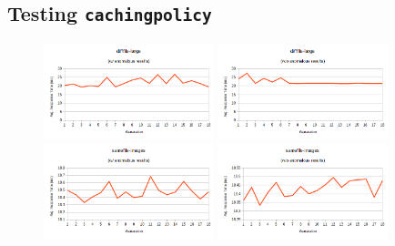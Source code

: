 \documentclass[compsoc,12pt,a4paper]{IEEEtran}
\begin{document}
		\subsection{Testing \lstinline|cachingpolicy|}
		\label{sec:testingcache}
		
			\begin{figure}
				\vspace{-20pt}
			  	\begin{center}
			    	\includegraphics[width=0.44\textwidth]{difffile-large}
					\vspace{-20pt}
			  		\caption{}
					\label{fig:difffile-large}
			    	\includegraphics[width=0.44\textwidth]{difffile-large-wo}
					\vspace{-20pt}
			  		\caption{}
					\label{fig:difffile-large-wo}
			    	\includegraphics[width=0.44\textwidth]{samefile-images}
					\vspace{-20pt}
			  		\caption{}
					\label{fig:samefile-images}
			    	\includegraphics[width=0.44\textwidth]{samefile-images-wo}
					\vspace{-20pt}
			  		\caption{}
					\label{fig:samefile-images-wo}
			  	\end{center}
				\vspace{-10pt}
			\end{figure}
\end{document}

